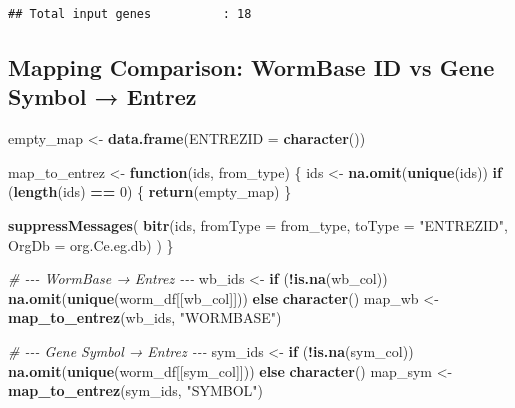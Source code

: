 \documentclass[
  11pt,
]{article}
\newenvironment{Shaded}{\begin{snugshade}}{\end{snugshade}}
\newcommand{\AttributeTok}[1]{\textcolor[rgb]{0.13,0.29,0.53}{#1}}
\newcommand{\CommentTok}[1]{\textcolor[rgb]{0.56,0.35,0.01}{\textit{#1}}}
\newcommand{\ControlFlowTok}[1]{\textcolor[rgb]{0.13,0.29,0.53}{\textbf{#1}}}
\newcommand{\DecValTok}[1]{\textcolor[rgb]{0.00,0.00,0.81}{#1}}
\newcommand{\FunctionTok}[1]{\textcolor[rgb]{0.13,0.29,0.53}{\textbf{#1}}}
\newcommand{\NormalTok}[1]{#1}
\newcommand{\OtherTok}[1]{\textcolor[rgb]{0.56,0.35,0.01}{#1}}
\newcommand{\SpecialCharTok}[1]{\textcolor[rgb]{0.81,0.36,0.00}{\textbf{#1}}}
\newcommand{\StringTok}[1]{\textcolor[rgb]{0.31,0.60,0.02}{#1}}
\begin{document}
\begin{verbatim}
## Total input genes          : 18
\end{verbatim}

\subsection{Mapping Comparison: WormBase ID vs Gene Symbol →
Entrez}\label{mapping-comparison-wormbase-id-vs-gene-symbol-entrez}

\begin{Shaded}
\begin{Highlighting}[]
\NormalTok{empty\_map }\OtherTok{\textless{}{-}} \FunctionTok{data.frame}\NormalTok{(}\AttributeTok{ENTREZID =} \FunctionTok{character}\NormalTok{())}

\NormalTok{map\_to\_entrez }\OtherTok{\textless{}{-}} \ControlFlowTok{function}\NormalTok{(ids, from\_type) \{}
\NormalTok{  ids }\OtherTok{\textless{}{-}} \FunctionTok{na.omit}\NormalTok{(}\FunctionTok{unique}\NormalTok{(ids))}
  \ControlFlowTok{if}\NormalTok{ (}\FunctionTok{length}\NormalTok{(ids) }\SpecialCharTok{==} \DecValTok{0}\NormalTok{) \{}
    \FunctionTok{return}\NormalTok{(empty\_map)}
\NormalTok{  \}}

  \FunctionTok{suppressMessages}\NormalTok{(}
    \FunctionTok{bitr}\NormalTok{(ids, }\AttributeTok{fromType =}\NormalTok{ from\_type, }\AttributeTok{toType =} \StringTok{"ENTREZID"}\NormalTok{, }\AttributeTok{OrgDb =}\NormalTok{ org.Ce.eg.db)}
\NormalTok{  )}
\NormalTok{\}}

\CommentTok{\# {-}{-}{-} WormBase → Entrez {-}{-}{-}}
\NormalTok{wb\_ids }\OtherTok{\textless{}{-}} \ControlFlowTok{if}\NormalTok{ (}\SpecialCharTok{!}\FunctionTok{is.na}\NormalTok{(wb\_col)) }\FunctionTok{na.omit}\NormalTok{(}\FunctionTok{unique}\NormalTok{(worm\_df[[wb\_col]])) }\ControlFlowTok{else} \FunctionTok{character}\NormalTok{()}
\NormalTok{map\_wb }\OtherTok{\textless{}{-}} \FunctionTok{map\_to\_entrez}\NormalTok{(wb\_ids, }\StringTok{"WORMBASE"}\NormalTok{)}

\CommentTok{\# {-}{-}{-} Gene Symbol → Entrez {-}{-}{-}}
\NormalTok{sym\_ids }\OtherTok{\textless{}{-}} \ControlFlowTok{if}\NormalTok{ (}\SpecialCharTok{!}\FunctionTok{is.na}\NormalTok{(sym\_col)) }\FunctionTok{na.omit}\NormalTok{(}\FunctionTok{unique}\NormalTok{(worm\_df[[sym\_col]])) }\ControlFlowTok{else} \FunctionTok{character}\NormalTok{()}
\NormalTok{map\_sym }\OtherTok{\textless{}{-}} \FunctionTok{map\_to\_entrez}\NormalTok{(sym\_ids, }\StringTok{"SYMBOL"}\NormalTok{)}


\end{Highlighting}
\end{Shaded}
\end{document}
